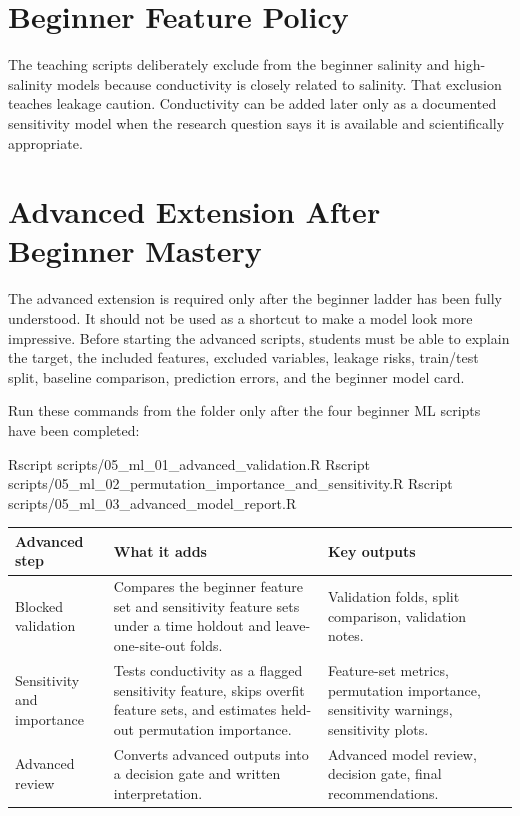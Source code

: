 \section{Beginner Feature Policy}

The teaching scripts deliberately exclude  from the beginner salinity and high-salinity models because conductivity is closely related to salinity. That exclusion teaches leakage caution. Conductivity can be added later only as a documented sensitivity model when the research question says it is available and scientifically appropriate.

\section{Advanced Extension After Beginner Mastery}

The advanced extension is required only after the beginner ladder has been fully understood. It should not be used as a shortcut to make a model look more impressive. Before starting the advanced scripts, students must be able to explain the target, the included features, excluded variables, leakage risks, train/test split, baseline comparison, prediction errors, and the beginner model card.

Run these commands from the  folder only after the four beginner ML scripts have been completed:

\begin{rcode}
Rscript scripts/05_ml_01_advanced_validation.R
Rscript scripts/05_ml_02_permutation_importance_and_sensitivity.R
Rscript scripts/05_ml_03_advanced_model_report.R
\end{rcode}

\begin{longtable}{p{}p{}p{}}
\toprule
\textbf{Advanced step} & \textbf{What it adds} & \textbf{Key outputs} \\
\midrule
Blocked validation & Compares the beginner feature set and sensitivity feature sets under a time holdout and leave-one-site-out folds. & Validation folds, split comparison, validation notes. \\
Sensitivity and importance & Tests conductivity as a flagged sensitivity feature, skips overfit feature sets, and estimates held-out permutation importance. & Feature-set metrics, permutation importance, sensitivity warnings, sensitivity plots. \\
Advanced review & Converts advanced outputs into a decision gate and written interpretation. & Advanced model review, decision gate, final recommendations. \\
\bottomrule
\end{longtable}

